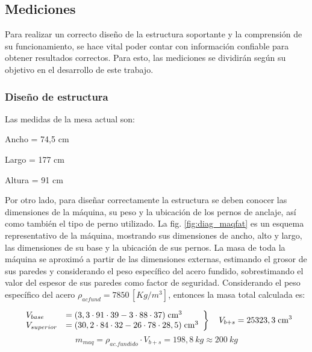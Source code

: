 \subsection{Mediciones}
\label{sec:mediciones_met}
Para realizar un correcto diseño de la estructura soportante y la comprensión de su funcionamiento, se hace vital poder contar con información confiable para obtener resultados correctos. Para esto, las mediciones se dividirán según su objetivo en el desarrollo de este trabajo.
\subsubsection{Diseño de estructura}
Las medidas de la mesa actual son: 
\begin{itemize*}
	\item Ancho = 74,5 cm
	\item Largo = 177 cm
	\item Altura = 91 cm
\end{itemize*}
Por otro lado, para diseñar correctamente la estructura se deben conocer las dimensiones de la máquina, su peso y la ubicación de los pernos de anclaje, así como también el tipo de perno utilizado. La fig. \ref{fig:diag_maqfat} es un esquema representativo de la máquina, mostrando sus dimensiones de ancho, alto y largo, las dimensiones de su base y la ubicación de sus pernos. La masa de toda la máquina se aproximó a partir de las dimensiones externas, estimando el grosor de sus paredes y considerando el peso específico del acero fundido, sobrestimando el valor del espesor de sus paredes como factor de seguridad. Considerando el peso específico del acero $\rho_{acfund} = 7850 \, [Kg/m^3]$, entonces la masa total calculada es:

\[ \left. 
\begin{array}{ll}
V_{base} &= (3,3\cdot 91\cdot 39 - 3\cdot 88\cdot 37)\; \text{cm}^3	\\
V_{superior} &=(30,2\cdot 84\cdot 32 - 26\cdot 78\cdot 28,5) \; \text{cm}^3	\\
\end{array}
\right\} \\
\quad V_{b+s} = 25323,3 \; \text{cm}^3 \]
\begin{equation}\label{eq:masa_maq}
	m_{maq} = \rho_{ac. fundido} \cdot V_{b+s} = 198,8 \: kg \approx 200 \: kg
\end{equation}

